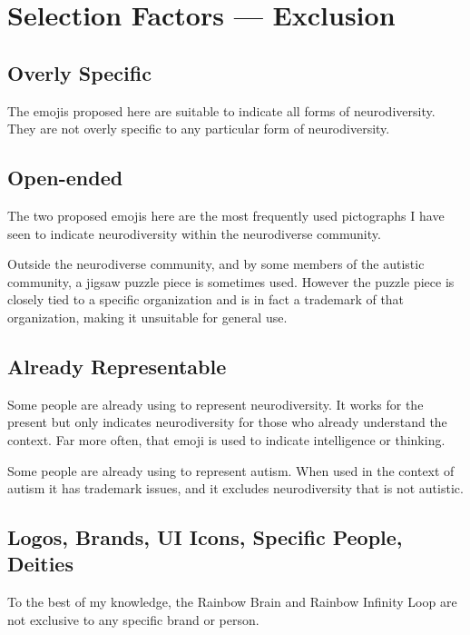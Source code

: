 \section{Selection Factors --- Exclusion}

\setcounter{subsection}{5}

\subsection{Overly Specific}

The emojis proposed here are suitable to indicate all forms of neurodiversity. They are not
overly specific to any particular form of neurodiversity.

\subsection{Open-ended}

The two proposed emojis here are the most frequently used pictographs I have seen to indicate
neurodiversity within the neurodiverse community.

Outside the neurodiverse community, and by some members of the autistic community, a jigsaw
puzzle piece is sometimes used. However the puzzle piece is closely tied to a specific organization
and is in fact a trademark of that organization, making it unsuitable for general use.

\subsection{Already Representable}

Some people are already using \brainemoji{} to represent neurodiversity.
It works for the present but only indicates neurodiversity for those
who already understand the context. Far more often, that emoji is used to indicate intelligence
or thinking.

Some people are already using \jigsawemoji{} to represent autism.
When used in the context of autism it has trademark issues, and it
excludes neurodiversity that is not autistic.

\subsection{Logos, Brands, UI Icons, Specific People, Deities}

To the best of my knowledge, the Rainbow Brain and Rainbow Infinity Loop are not exclusive to
any specific brand or person.

